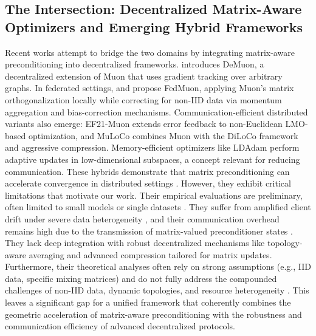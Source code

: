 \documentclass[11pt]{article}
\begin{document}
\subsection{The Intersection: Decentralized Matrix-Aware Optimizers and Emerging Hybrid Frameworks}
Recent works attempt to bridge the two domains by integrating matrix-aware preconditioning into decentralized frameworks. \citet{he2025demuon} introduces DeMuon, a decentralized extension of Muon that uses gradient tracking over arbitrary graphs. In federated settings, \citet{liu2025fedmuon} and \citet{Takezawa2025FedMuonFL} propose FedMuon, applying Muon's matrix orthogonalization locally while correcting for non-IID data via momentum aggregation and bias-correction mechanisms. Communication-efficient distributed variants also emerge: EF21-Muon \citep{Gruntkowska2025ErrorFF} extends error feedback to non-Euclidean LMO-based optimization, and MuLoCo \citep{Th'erien2025MuLoCoMI} combines Muon with the DiLoCo framework and aggressive compression. Memory-efficient optimizers like LDAdam \citep{Robert2024LDAdamAO} perform adaptive updates in low-dimensional subspaces, a concept relevant for reducing communication. These hybrids demonstrate that matrix preconditioning can accelerate convergence in distributed settings \citep{blot2016gossip, Alghunaim2023LocalEF, li2019convergence}. However, they exhibit critical limitations that motivate our work. Their empirical evaluations are preliminary, often limited to small models or single datasets \citep{he2025demuon, Takezawa2025FedMuonFL, Gruntkowska2025ErrorFF}. They suffer from amplified client drift under severe data heterogeneity \citep{liu2025fedmuon}, and their communication overhead remains high due to the transmission of matrix-valued preconditioner states \citep{Renggli2018SparCMLHS}. They lack deep integration with robust decentralized mechanisms like topology-aware averaging and advanced compression tailored for matrix updates. Furthermore, their theoretical analyses often rely on strong assumptions (e.g., IID data, specific mixing matrices) and do not fully address the compounded challenges of non-IID data, dynamic topologies, and resource heterogeneity \citep{he2025demuon}. This leaves a significant gap for a unified framework that coherently combines the geometric acceleration of matrix-aware preconditioning with the robustness and communication efficiency of advanced decentralized protocols.



\end{document}
